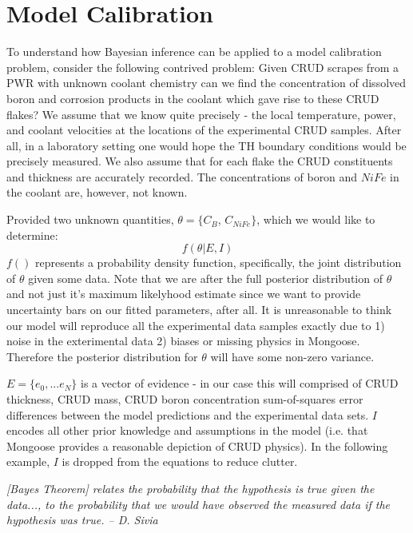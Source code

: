 \documentclass[10pt,a4paper]{report}
\begin{document}
\chapter{Model Calibration}

To understand how Bayesian inference can be applied to a model calibration problem, consider the following contrived problem:  Given CRUD scrapes from a PWR with unknown coolant chemistry can we find the concentration of dissolved boron and corrosion products in the coolant which gave rise to these CRUD flakes?  We assume that we know quite precisely - the local temperature, power, and coolant velocities at the locations of the experimental CRUD samples. After all, in a laboratory setting one would hope the TH boundary conditions would be precisely measured.  We also assume that for each flake the CRUD constituents and thickness are accurately recorded.  The concentrations of boron and $NiFe$ in the coolant are, however, not known.

Provided two unknown quantities, $\theta = \{C_{B}$, $C_{NiFe}\}$, which we would like to determine:
\begin{equation}
f(\theta| E, I)
\label{eq:target}
\end{equation}
$f()$ represents a probability density function, specifically, the joint distribution of $\theta$  given some data.  Note that we are after the full posterior distribution of $\theta$ and not just it's maximum likelyhood estimate since we want to provide uncertainty bars on our fitted parameters, after all.  It is unreasonable to think our model will reproduce all the experimental data samples exactly due to 1) noise in the exterimental data 2) biases or missing physics in Mongoose.  Therefore the posterior distribution for $\theta$ will have some non-zero variance.

$E=\{e_0, ... e_N\}$ is a vector of evidence - in our case this will comprised of CRUD thickness, CRUD mass, CRUD boron concentration sum-of-squares error differences between the model predictions and the experimental data sets. $I$ encodes all other prior knowledge and assumptions in the model (i.e. that Mongoose provides a reasonable depiction of CRUD physics).  In the following example, $I$ is dropped from the equations to reduce clutter.

\emph{[Bayes Theorem] relates the probability that the hypothesis is true given the data..., to the probability that we would have observed the measured data if the hypothesis was true. -- D. Sivia}
\end{document}
